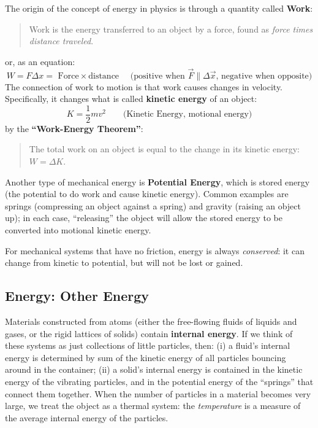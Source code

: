 The origin of the concept of energy in physics is through a quantity called {\bf Work}:
	\begin{quote}
	Work is the energy transferred to an object by a force, found as {\em force times distance traveled}.
	\end{quote}
or, as an equation:
	\begin{equation*}
	W = F \Delta x  = \text{ Force} \times \text{distance } \quad \text{(positive when $\vec{F} \parallel \Delta \vec{x}$, negative when opposite)}
	\end{equation*}
The connection of work to motion is that work causes changes in velocity.  Specifically, it changes what is called {\bf kinetic energy} of an object:
	\begin{equation}
	K = \frac{1}{2} m v^2 	\quad \quad  \text{(Kinetic Energy, motional energy)}
	\end{equation}
by the {\bf ``Work-Energy Theorem''}:
	\begin{quote}
	The total work on an object is equal to the change in its kinetic energy: $W = \Delta K$.
	\end{quote}
Another type of mechanical energy is {\bf Potential Energy}, which is stored energy (the potential to do work and cause kinetic energy). Common examples are springs (compressing an object against a spring) and gravity (raising an object up); in each case, ``releasing'' the object will allow the stored energy to be converted into motional kinetic energy.

For mechanical systems that have no friction, energy is always {\em conserved}: it can change from kinetic to potential, but will not be lost or gained.

\subsection{Energy: Other Energy}

Materials constructed from atoms (either the free-flowing fluids of liquids and gases, or the rigid lattices of solids) contain {\bf internal energy}.  If we think of these systems as just collections of little particles, then: (i)  a fluid's internal energy is determined by sum of the kinetic energy of all particles bouncing around in the container; (ii) a solid's internal energy is contained in the kinetic energy of the vibrating particles, and in the potential energy of the ``springs'' that connect them together.  When the number of particles in a material becomes very large, we treat the object as a thermal system: the {\em temperature} is a measure of the average internal energy of the particles.

